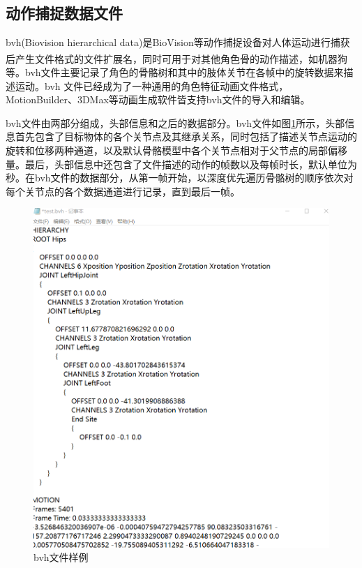 \subsection{动作捕捉数据文件}{}
bvh(Biovision hierarchical data)是BioVision等动作捕捉设备对人体运动进行捕获后产生文件格式的文件扩展名\textsuperscript{\cite{p13}}，同时可用于对其他角色骨的动作描述，如机器狗等。bvh文件主要记录了角色的骨骼树和其中的肢体关节在各帧中的旋转数据来描述运动。bvh 文件已经成为了一种通用的角色特征动画文件格式，MotionBuilder、3DMax等动画生成软件皆支持bvh文件的导入和编辑。

bvh文件由两部分组成，头部信息和之后的数据部分。bvh文件如图\ref{fig:f15}所示，头部信息首先包含了目标物体的各个关节点及其继承关系，同时包括了描述关节点运动的旋转和位移两种通道，以及默认骨骼模型中各个关节点相对于父节点的局部偏移量。最后，头部信息中还包含了文件描述的动作的帧数以及每帧时长，默认单位为秒。在bvh文件的数据部分，从第一帧开始，以深度优先遍历骨骼树的顺序依次对每个关节点的各个数据通道进行记录，直到最后一帧。

\begin{figure}[h]
	\centering
	\includegraphics[scale=1]{figures/15.png}
	\caption{bvh文件样例}
	\label{fig:f15}
\end{figure}

